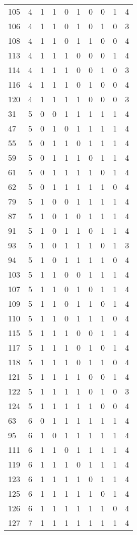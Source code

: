 \documentclass[a4paper,UKenglish]{lipics-v2016}
\begin{document}
\begin{longtable}[c]{|p{}||p{}||p{} p{} p{} p{} p{} p{} p{}|p{}|}
			105 & 4 & 1 & 1 & 0 & 1 & 0 & 0 & 1 & 4 \\
			106 & 4 & 1 & 1 & 0 & 1 & 0 & 1 & 0 & 3 \\
			108 & 4 & 1 & 1 & 0 & 1 & 1 & 0 & 0 & 4 \\
			113 & 4 & 1 & 1 & 1 & 0 & 0 & 0 & 1 & 4 \\
			114 & 4 & 1 & 1 & 1 & 0 & 0 & 1 & 0 & 3 \\
			116 & 4 & 1 & 1 & 1 & 0 & 1 & 0 & 0 & 4 \\
			120 & 4 & 1 & 1 & 1 & 1 & 0 & 0 & 0 & 3 \\\hline 
			31  & 5 & 0 & 0 & 1 & 1 & 1 & 1 & 1 & 4 \\
			47  & 5 & 0 & 1 & 0 & 1 & 1 & 1 & 1 & 4 \\
			55  & 5 & 0 & 1 & 1 & 0 & 1 & 1 & 1 & 4 \\
			59  & 5 & 0 & 1 & 1 & 1 & 0 & 1 & 1 & 4 \\
			61  & 5 & 0 & 1 & 1 & 1 & 1 & 0 & 1 & 4 \\
			62  & 5 & 0 & 1 & 1 & 1 & 1 & 1 & 0 & 4 \\
			79  & 5 & 1 & 0 & 0 & 1 & 1 & 1 & 1 & 4 \\
			87  & 5 & 1 & 0 & 1 & 0 & 1 & 1 & 1 & 4 \\
			91  & 5 & 1 & 0 & 1 & 1 & 0 & 1 & 1 & 4 \\
			93  & 5 & 1 & 0 & 1 & 1 & 1 & 0 & 1 & 3 \\
			94  & 5 & 1 & 0 & 1 & 1 & 1 & 1 & 0 & 4 \\
			103 & 5 & 1 & 1 & 0 & 0 & 1 & 1 & 1 & 4 \\
			107 & 5 & 1 & 1 & 0 & 1 & 0 & 1 & 1 & 4 \\
			109 & 5 & 1 & 1 & 0 & 1 & 1 & 0 & 1 & 4 \\
			110 & 5 & 1 & 1 & 0 & 1 & 1 & 1 & 0 & 4 \\
			115 & 5 & 1 & 1 & 1 & 0 & 0 & 1 & 1 & 4 \\
			117 & 5 & 1 & 1 & 1 & 0 & 1 & 0 & 1 & 4 \\
			118 & 5 & 1 & 1 & 1 & 0 & 1 & 1 & 0 & 4 \\
			121 & 5 & 1 & 1 & 1 & 1 & 0 & 0 & 1 & 4 \\
			122 & 5 & 1 & 1 & 1 & 1 & 0 & 1 & 0 & 3 \\
			124 & 5 & 1 & 1 & 1 & 1 & 1 & 0 & 0 & 4 \\\hline
			63  & 6 & 0 & 1 & 1 & 1 & 1 & 1 & 1 & 4 \\
			95  & 6 & 1 & 0 & 1 & 1 & 1 & 1 & 1 & 4 \\
			111 & 6 & 1 & 1 & 0 & 1 & 1 & 1 & 1 & 4 \\
			119 & 6 & 1 & 1 & 1 & 0 & 1 & 1 & 1 & 4 \\
			123 & 6 & 1 & 1 & 1 & 1 & 0 & 1 & 1 & 4 \\
			125 & 6 & 1 & 1 & 1 & 1 & 1 & 0 & 1 & 4 \\
			126 & 6 & 1 & 1 & 1 & 1 & 1 & 1 & 0 & 4 \\\hline
			127 & 7 & 1 & 1 & 1 & 1 & 1 & 1 & 1 & 4 	\\\hline
\end{longtable}
\end{document}
